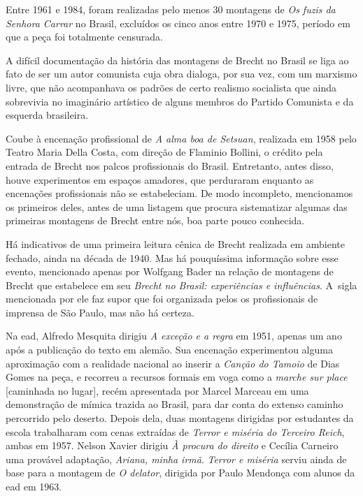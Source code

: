 Entre 1961 e 1984, foram realizadas pelo menos 30 montagens de {\it Os
fuzis da Senhora Carrar} no Brasil, excluídos os cinco anos entre 1970 e
1975, período em que a peça foi totalmente censurada.

\subject{Brecht dos amadores}

A difícil documentação da história das montagens de Brecht no Brasil se
liga ao fato de ser um autor comunista cuja obra dialoga, por sua vez,
com um marxismo livre, que não acompanhava os padrões de certo realismo
socialista que ainda sobrevivia no imaginário artístico de alguns
membros do Partido Comunista e da esquerda brasileira.

Coube à encenação profissional de {\it A alma boa de Setsuan}, realizada
em 1958 pelo Teatro Maria Della Costa, com direção de Flaminio Bollini,
o crédito pela entrada de Brecht nos palcos profissionais do Brasil.
Entretanto, antes disso, houve experimentos em espaços amadores, que
perduraram enquanto as encenações profissionais não se estabeleciam. De
modo incompleto, mencionamos os primeiros deles, antes de uma listagem
que procura sistematizar algumas das primeiras montagens de Brecht entre
nós, boa parte pouco conhecida.

Há indicativos de uma primeira leitura cênica de Brecht realizada em
ambiente fechado, ainda na década de 1940. Mas há pouquíssima informação
sobre esse evento, mencionado apenas por Wolfgang Bader na relação de
montagens de Brecht que estabelece em seu {\it Brecht no Brasil:
experiências e influências}. A~sigla mencionada por ele faz supor que
foi organizada pelos os profissionais de imprensa de São Paulo, mas não
há certeza.

Na {\sc ead}, Alfredo Mesquita dirigiu {\it A exceção e a regra} em 1951,
apenas um ano após a publicação do texto em alemão. Sua encenação
experimentou alguma aproximação com a realidade nacional ao inserir a
{\it Canção do Tamoio} de Dias Gomes na peça, e recorreu a recursos
formais em voga como a {\it marche sur place} {[}caminhada no lugar{]},
recém apresentada por Marcel Marceau em uma demonstração de mímica
trazida ao Brasil, para dar conta do extenso caminho percorrido pelo
deserto. Depois dela, duas montagens dirigidas por estudantes da escola
trabalharam com cenas extraídas de {\it Terror e miséria do Terceiro
Reich}, ambas em 1957. Nelson Xavier dirigiu {\it À procura do direito}
e Cecília Carneiro uma provável adaptação, {\it Ariana, minha irmã}.
{\it Terror e miséria} serviu ainda de base para a montagem de {\it O
delator}, dirigida por Paulo Mendonça com alunos da {\sc ead} em 1963.

